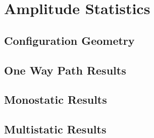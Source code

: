 \renewcommand{\baselinestretch}{2} \small\normalsize
\chapter{Amplitude Statistics}

\section{Configuration Geometry}
\section{One Way Path Results}
\section{Monostatic Results}
\section{Multistatic Results}